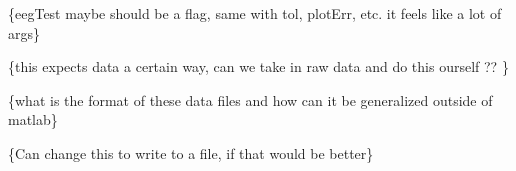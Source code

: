 
\begin{DoxyRefList}
\item[\label{todo__todo000002}%
\Hypertarget{todo__todo000002}%
Member \hyperlink{classBlnkPeakSegAvg_aa968b86e939b44e6b2585ae5dff022b3}{Blnk\+Peak\+Seg\+Avg\+:\+:\+\_\+eeg\+File} ]\{eeg\+Test maybe should be a flag, same with tol, plot\+Err, etc. it feels like a lot of args\} 

\{this expects data a certain way, can we take in raw data and do this ourself ?? \}  
\item[\label{todo__todo000001}%
\Hypertarget{todo__todo000001}%
Member \hyperlink{classBlnkPeakSegAvg_a0dc6865b43997d95a59da56e3be254c8}{Blnk\+Peak\+Seg\+Avg\+:\+:\+\_\+pntr\+Blnk\+File} ]\{what is the format of these data files and how can it be generalized outside of matlab\}  
\item[\label{todo__todo000003}%
\Hypertarget{todo__todo000003}%
Member \hyperlink{classBlnkPeakSegAvg_ac6acee0554ddea948407e294c7a21eff}{Blnk\+Peak\+Seg\+Avg\+:\+:log\+Action} (const string)]\{Can change this to write to a file, if that would be better\} 
\end{DoxyRefList}